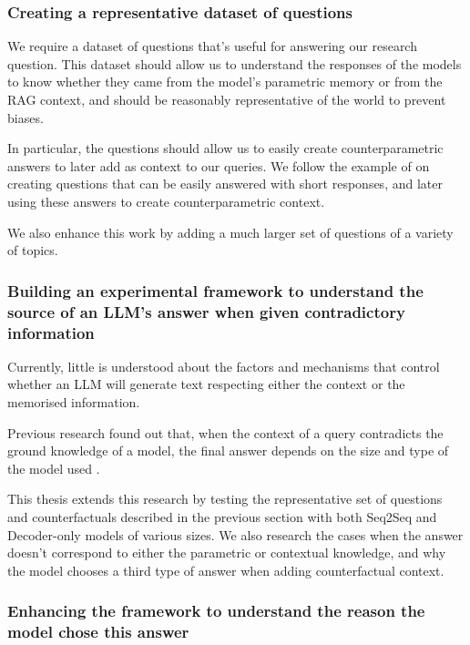 \subsubsection{Creating a representative dataset of questions}
\label{questions_objective}

We require a dataset of questions that's useful for answering our research question.
This dataset should allow us to understand the responses of the models to know whether they came from the model's parametric memory or from the RAG context, and should be reasonably representative of the world to prevent biases.

In particular, the questions should allow us to easily create counterparametric answers to later add as context to our queries.
We follow the example of \citeauthor{factual_recall} on creating questions that can be easily answered with short responses, and later using these answers to create counterparametric context.

We also enhance this work by adding a much larger set of questions of a variety of topics.

\subsubsection{Building an experimental framework to understand the source of an LLM's answer when given contradictory information}
\label{intro_models_numbers}

Currently, little is understood about the factors and mechanisms that control whether an LLM will generate text respecting either the context or the memorised information.

Previous research found out that, when the context of a query contradicts the ground knowledge of a model, the final answer depends on the size and type of the model used \citep{factual_recall}.

This thesis extends this research by testing the representative set of questions and counterfactuals described in the previous section with both Seq2Seq and Decoder-only models of various sizes.
We also research the cases when the answer doesn't correspond to either the parametric or contextual knowledge, and why the model chooses a third type of answer when adding counterfactual context.


\subsubsection{Enhancing the framework to understand the reason the model chose this answer}


